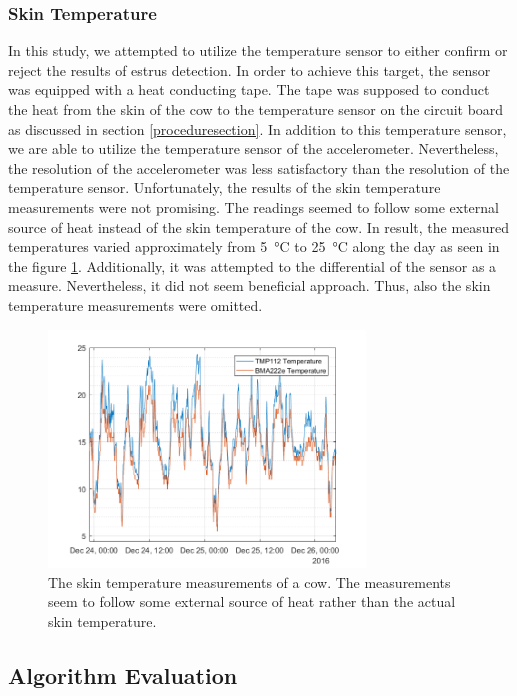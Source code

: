 \documentclass[english,12pt,a4paper,pdftex,elec,utf8]{aaltothesis}
\begin{document}
\subsubsection{Skin Temperature}

In this study, we attempted to utilize the temperature sensor to either confirm or reject the results of estrus detection. In order to achieve this target, the sensor was equipped with a heat conducting tape. The tape was supposed to conduct the heat from the skin of the cow to the temperature sensor on the circuit board as discussed in section \ref{proceduresection}. In addition to this temperature sensor, we are able to utilize the temperature sensor of the accelerometer. Nevertheless, the resolution of the accelerometer was less satisfactory than the resolution of the temperature sensor. Unfortunately, the results of the skin temperature measurements were not promising. The readings seemed to follow some external source of heat instead of the skin temperature of the cow. In result, the measured temperatures varied approximately from \SI{5}{\celsius} to \SI{25}{\celsius} along the day as seen in the figure \ref{temperaturemeasurements}. Additionally, it was attempted to the differential of the sensor as a measure. Nevertheless, it did not seem beneficial approach. Thus, also the skin temperature measurements were omitted. 

\begin{figure}[h]
\centering
\includegraphics[width = 0.75\textwidth]{figures/lehma9885temperature.png}
\caption{The skin temperature measurements of a cow. The measurements seem to follow some external source of heat rather than the actual skin temperature.}
\label{temperaturemeasurements}
\end{figure}


\subsection{Algorithm Evaluation} \label{algorithmevaluationsection}
\end{document}
